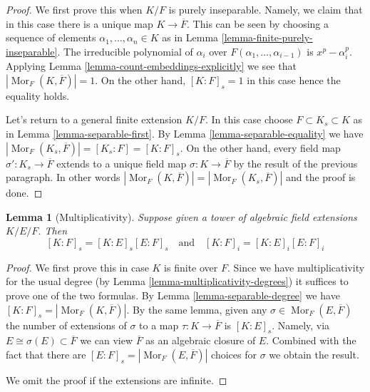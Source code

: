 \documentclass{stacks-project}
\theoremstyle{plain}
\newtheorem{lemma}[subsection]{Lemma}
\theoremstyle{definition}
\theoremstyle{remark}
\numberwithin{equation}{subsection}
\def\Mor{\mathop{\mathrm{Mor}}\nolimits}
\begin{document}
\begin{proof}
We first prove this when $K/F$ is purely inseparable. Namely, we claim that
in this case there is a unique map $K \to \overline{F}$. This can be
seen by choosing a sequence of elements $\alpha_1, \ldots, \alpha_n \in K$
as in Lemma \ref{lemma-finite-purely-inseparable}. The irreducible polynomial
of $\alpha_i$ over $F(\alpha_1, \ldots, \alpha_{i - 1})$ is $x^p - \alpha_i^p$.
Applying Lemma \ref{lemma-count-embeddings-explicitly} we see that
$|\Mor_F(K, \overline{F})| = 1$. On the other hand, $[K : F]_s = 1$
in this case hence the equality holds.

\medskip\noindent
Let's return to a general finite extension $K/F$. In this case
choose $F \subset K_s \subset K$ as in Lemma \ref{lemma-separable-first}.
By Lemma \ref{lemma-separable-equality} we have
$|\Mor_F(K_s, \overline{F})| = [K_s : F] = [K : F]_s$.
On the other hand, every field map $\sigma' : K_s \to \overline{F}$
extends to a unique field map $\sigma : K \to \overline{F}$ by the
result of the previous paragraph. In other words
$|\Mor_F(K, \overline{F})| = |\Mor_F(K_s, \overline{F})|$
and the proof is done.
\end{proof}

\begin{lemma}[Multiplicativity]
\label{lemma-multiplicativity-all-degrees}
Suppose given a tower of algebraic field extensions $K/E/F$. Then
$$
[K : F]_s = [K : E]_s [E : F]_s
\quad\text{and}\quad
[K : F]_i = [K : E]_i [E : F]_i
$$
\end{lemma}

\begin{proof}
We first prove this in case $K$ is finite over $F$. Since we have
multiplicativity for the usual degree (by
Lemma \ref{lemma-multiplicativity-degrees}) it suffices to prove
one of the two formulas. By Lemma \ref{lemma-separable-degree} we have
$[K : F]_s = |\Mor_F(K, \overline{F})|$. By the same lemma,
given any $\sigma \in \Mor_F(E, \overline{F})$ the number of extensions
of $\sigma$ to a map $\tau : K \to \overline{F}$ is $[K : E]_s$.
Namely, via $E \cong \sigma(E) \subset \overline{F}$ we can view
$\overline{F}$ as an algebraic closure of $E$. Combined with the
fact that there are $[E : F]_s = |\Mor_F(E, \overline{F})|$ choices
for $\sigma$ we obtain the result.

\medskip\noindent
We omit the proof if the extensions are infinite.
\end{proof}
\end{document}
